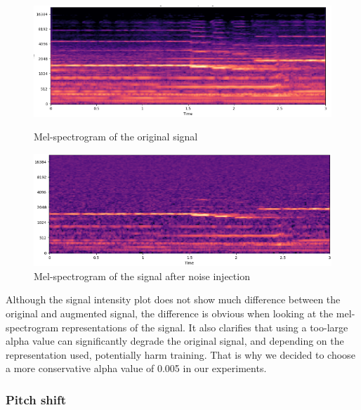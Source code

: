 \begin{figure}[H]
        \begin{minipage}{0.49\textwidth}
            \centering
            \includegraphics[width=\linewidth]{images/noise-injection-original-spectogram.png}
            \caption*{Mel-spectrogram of the original signal}
        \end{minipage}%
        \hfill%
        \begin{minipage}{0.49\textwidth}
            \centering
            \includegraphics[width=\linewidth]{images/noise-injection-augmented-spectogram.png}
            \caption*{Mel-spectrogram of the signal after noise injection}
        \end{minipage}
                
        
        \label{fig:noise-injection}
        
    \end{figure}

Although the signal intensity plot does not show much difference between the original and augmented signal, the difference is obvious when looking at the mel-spectrogram representations of the signal. It also clarifies that using a too-large alpha value can significantly degrade the original signal, and depending on the representation used, potentially harm training. That is why we decided to choose a more conservative alpha value of 0.005 in our experiments.

\subsubsection{Pitch shift}

